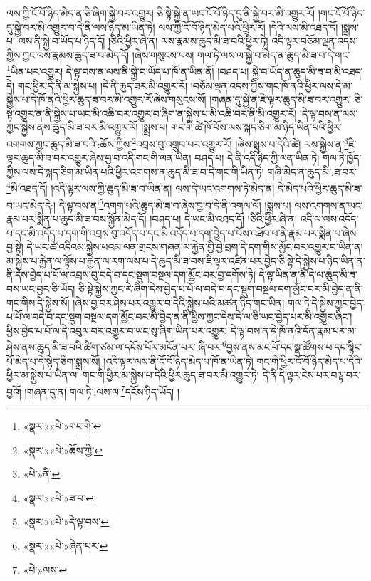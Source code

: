 ལས་ཀྱི་ངོ་བོ་ཉིད་མེད་ན་ཅི་ཞིག་སྐྱེ་བར་འགྱུར། ཅི་སྟེ་སྐྱེ་ན་ཡང་ངོ་བོ་ཉིད་དུ་ནི་སྐྱེ་བར་མི་འགྱུར་རོ། །གང་ངོ་བོ་ཉིད་དུ་སྐྱེ་བར་མི་འགྱུར་བ་དེ་ནི་ལས་ཉིད་མ་ཡིན་ཏེ། ལས་ཀྱི་ངོ་བོ་ཉིད་མེད་པའི་ཕྱིར་རོ། །དེའི་ལས་མི་འཐད་དོ། །སྨྲས་པ། ལས་ནི་སྐྱེ་བ་ཡོད་པ་ཉིད་དོ། །ཅིའི་ཕྱིར་ཞེ་ན། ལས་རྣམས་ཆུད་མི་ཟ་བའི་ཕྱིར་ཏེ། འདི་ལྟར་བཅོམ་ལྡན་འདས་ཀྱིས་ཀྱང་ལས་རྣམས་ཆུད་ཟ་བ་མེད་དོ། །ཞེས་གསུངས་པས། གལ་ཏེ་ལས་ལ་སྐྱེ་བ་མེད་ན་ཆུད་མི་ཟ་བ་དེ་གང་\footnote{«སྣར་»«པེ་»གང་གི་}ཡིན་པར་འགྱུར། དེ་ལྟ་བས་ན་ལས་ནི་སྐྱེ་བ་ཡོད་པ་ཁོ་ན་ཡིན་ནོ། །བཤད་པ། སྐྱེ་བ་ཡོད་ན་ཆུད་མི་ཟ་བ་མི་འཐད་དེ། གང་ཕྱིར་དེ་ནི་མ་སྐྱེས་པ། །དེ་ནི་ཆུད་ཟར་མི་འགྱུར་རོ། །བཅོམ་ལྡན་འདས་ཀྱིས་གང་ཁོ་ནའི་ཕྱིར་ལས་དེ་མ་སྐྱེས་པ་དེ་ཁོ་ནའི་ཕྱིར་ཆུད་ཟ་བར་མི་འགྱུར་རོ་ཞེས་གསུངས་སོ། །གཞན་དུ་སྐྱེ་ན་ཇི་ལྟར་ཆུད་མི་ཟ་བར་འགྱུར། ཅི་སྟེ་འགྱུར་ན་ནི་སྐྱེས་པ་ཡང་མི་འཆི་བར་འགྱུར་བ་ཞིག་ན་སྐྱེས་པ་མི་འཆི་བར་ནི་མི་འགྱུར་རོ། །དེ་ལྟ་བས་ན་ལས་ཀྱང་སྐྱེས་ནས་ཆུད་མི་ཟ་བར་མི་འགྱུར་རོ། །སྨྲས་པ། གང་གི་ཚེ་ཁོ་བོས་ལས་སྐད་ཅིག་མ་ཉིད་ཡིན་པའི་ཕྱིར་འགགས་ཀྱང་ཆུད་མི་ཟ་བའི་:ཆོས་ཀྱིས་\footnote{«སྣར་»«པེ་»ཆོས་ཀྱི་}འབྲས་བུ་འགྲུབ་པར་འགྱུར་རོ། །ཞེས་སྨྲས་པ་དེའི་ཚེ། ལས་སྐྱེས་ན་\footnote{«པེ་»ནི་}ཇི་ལྟར་ཆུད་མི་ཟ་བར་འགྱུར་ཞེས་བྱ་བ་འདི་གང་གི་ལན་ཡིན། བཤད་པ། དེ་ནི་འདི་ཉིད་ཀྱི་ལན་ཡིན་ཏེ། གལ་ཏེ་ཁྱོད་ཀྱིས་ལས་དེ་སྐད་ཅིག་མ་ཡིན་པའི་ཕྱིར་འགགས་ན་ཆུད་མི་ཟ་བ་དེ་གང་གི་ཡིན་ཏེ། གཞི་མེད་ན་ཆུད་མི་:ཟ་བར་\footnote{«སྣར་»«པེ་»ཟ་བ་}མི་འཐད་དོ། །འདི་ལྟར་ལས་ཀྱི་ཆུད་མི་ཟ་བ་ཡིན་ན། ལས་དེ་ཡང་འགགས་ཏེ་མེད་ན། དེ་མེད་པའི་ཕྱིར་ཆུད་མི་ཟ་བ་ཡང་མེད་དེ:། དེ་ལྟ་བས་ན་\footnote{«སྣར་»«པེ་»དེ་ལྟ་བས་}འགག་པའི་ཆུད་མི་ཟ་བ་ཞེས་བྱ་བ་དེ་ནི་འགལ་ལོ། །སྨྲས་པ། ལས་འགགས་ན་ཡང་རྣམ་པར་སྨིན་པ་ཆུད་མི་ཟ་བས་སྐྱོན་མེད་དོ། །བཤད་པ། དེ་ཡང་མི་འཐད་དོ། །ཅིའི་ཕྱིར་ཞེ་ན། འདི་ལ་ལས་འདོད་པ་དང་མི་འདོད་པ་དག་གི་འབྲས་བུ་འདོད་པ་དང་མི་འདོད་པ་དག་བྱེད་པ་པོས་འཐོབ་པ་ནི་རྣམ་པར་སྨིན་པ་ཞེས་བྱ་སྟེ། དེ་ཡང་ཚེ་འདིའམ་སྐྱེས་པའམ་ལན་གྲངས་གཞན་ལ་རྐྱེན་གྱི་བྱེ་བྲག་དེ་དག་གིས་མྱོང་བར་འགྱུར་བ་ཡིན་ན། མ་སྐྱེས་པ་རྐྱེན་ལ་ལྟོས་པ་རྐྱེན་ལ་རག་ལས་པ་དེ་ཆུད་མི་ཟ་བས་ཇི་ལྟར་འཛིན་པར་བྱེད་ཅི་སྟེ་དེ་སྐྱེས་པ་ཉིད་ཡིན་ན་ནི་དེས་བྱེད་པ་པོ་ལ་འབྲས་བུ་བདེ་བ་དང་སྡུག་བསྔལ་དག་མྱོང་བར་བྱ་དགོས་ཏེ། དེ་ལྟ་ཡིན་ན་ནི་དེ་ལ་ཆུད་མི་ཟ་བས་ཡང་བྱར་ཅི་ཡོད། ཅི་སྟེ་སྐྱེས་ཀྱང་རེ་ཞིག་དེས་བྱེད་པ་པོ་ལ་བདེ་བ་དང་སྡུག་བསྔལ་དག་མྱོང་བར་མི་བྱེད་ན་ནི་གང་གིས་དེ་སྐྱེས་སོ། །ཞེས་བྱ་བར་ཤེས་པར་འགྱུར་བ་དེའི་སྐྱེས་པའི་མཚན་ཉིད་གང་ཡིན། གལ་ཏེ་དེ་སྐྱེས་ཀྱང་བྱེད་པ་པོ་ལ་བདེ་བ་དང་སྡུག་བསྔལ་དག་མྱོང་བར་མི་བྱེད་ན་ནི་ཕྱིས་ཀྱང་དེས་དེ་ལ་ཅི་ཡང་བྱེད་པར་མི་འགྱུར་ཞིང་། ཕྱིས་བྱེད་པ་པོ་ལ་དེ་འབུལ་བར་འགྱུར་བ་ཡང་སུ་ཞིག་ཡིན་པར་འགྱུར། དེ་ལྟ་བས་ན་དེ་ཁོ་ནའི་དོན་རྣམ་པར་མ་ཤེས་ནས་ཆུད་མི་ཟ་བའི་ཚིག་ཙམ་ལ་དངོས་པོར་མངོན་པར་:ཞི་བར་\footnote{«སྣར་»«པེ་»ཞེན་པར་}བྱས་ནས་མང་པོ་དང་སྣ་ཚོགས་པ་དང་སྙིང་པོ་མེད་པ་དེ་སྙེད་ཅིག་སྨྲས་སོ། །འདི་ལྟར་ལས་ནི་ངོ་བོ་ཉིད་མེད་པ་ཁོ་ན་ཡིན་ཏེ། གང་གི་ཕྱིར་ངོ་བོ་ཉིད་མེད་པ་དེའི་ཕྱིར་མ་སྐྱེས་པ་ཡིན་ལ། གང་གི་ཕྱིར་མ་སྐྱེས་པ་དེའི་ཕྱིར་ཆུད་ཟ་བར་མི་འགྱུར་ཏེ། དེ་ནི་དེ་ལྟར་ངེས་པར་བལྟ་བར་བྱའོ། །གཞན་དུ་ན། གལ་ཏེ་:ལས་ལ་\footnote{«པེ་»ལས་}དངོས་ཉིད་ཡོད། །
